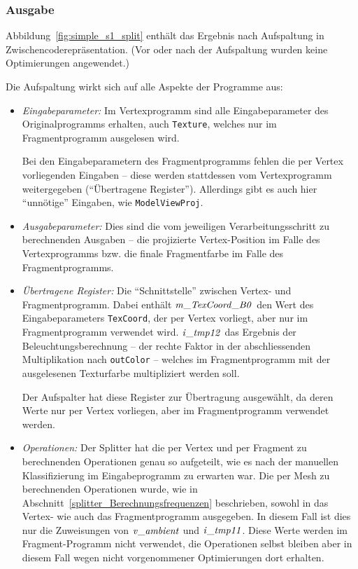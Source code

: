 \documentclass[twoside,a4paper,fleqn,12pt]{book}
\begin{document}
\subsubsection{Ausgabe}

Abbildung~\ref{fig:simple_s1_split} enthält das Ergebnis nach Aufspaltung in Zwischencoderepräsentation.
(Vor oder nach der Aufspaltung wurden keine Optimierungen angewendet.)

Die Aufspaltung wirkt sich auf alle Aspekte der Programme aus:
\begin{itemize}
\item \emph{Eingabeparameter:} Im Vertexprogramm sind alle Eingabeparameter des Originalprogramms erhalten,
auch \texttt{Texture}, welches nur im Fragmentprogramm ausgelesen wird.

Bei den Eingabeparametern des Fragmentprogramms fehlen die per Vertex vorliegenden Eingaben -- diese werden
stattdessen vom Vertexprogramm weitergegeben ("`Übertragene Register"'). Allerdings gibt es auch
hier "`unnötige"' Eingaben, wie \texttt{ModelViewProj}. 

\item \emph{Ausgabeparameter:} Dies sind die vom jeweiligen Verarbeitungsschritt zu berechnenden Ausgaben --
die projizierte Vertex-Position im Falle des Vertexprogramms bzw. die finale Fragmentfarbe im Falle des
Fragmentprogramms.

\item \emph{Übertragene Register:} Die "`Schnittstelle"' zwischen Vertex- und Fragmentprogramm.
Dabei enthält $\mathit{m\_TexCoord\_B0}$ den Wert des Eingabeparameters \texttt{TexCoord}, der per Vertex vorliegt,
aber nur im Fragmentprogramm verwendet wird. $\mathit{i\_tmp12}$ das Ergebnis der Beleuchtungsberechnung
-- der rechte Faktor in der abschliessenden Multiplikation nach \texttt{outColor} --
welches im Fragmentprogramm mit der ausgelesenen Texturfarbe multipliziert werden soll.

Der Aufspalter hat diese Register zur Übertragung ausgewählt, da deren Werte nur per Vertex vorliegen,
aber im Fragmentprogramm verwendet werden.

\item \emph{Operationen:} Der Splitter hat die per Vertex und per Fragment zu berechnenden Operationen
genau so aufgeteilt, wie es nach der manuellen Klassifizierung im Eingabeprogramm zu erwarten war.
Die per Mesh zu berechnenden Operationen wurde, wie in Abschnitt~\ref{splitter_Berechnungsfrequenzen}
beschrieben, sowohl in das Vertex- wie auch das Fragmentprogramm ausgegeben. In diesem Fall ist dies
nur die Zuweisungen von $\mathit{v\_ambient}$ und $\mathit{i\_tmp11}$. Diese Werte werden im Fragment-Programm nicht verwendet,
die Operationen selbst bleiben aber in diesem Fall wegen nicht vorgenommener Optimierungen dort erhalten.

\end{itemize}
\end{document}
